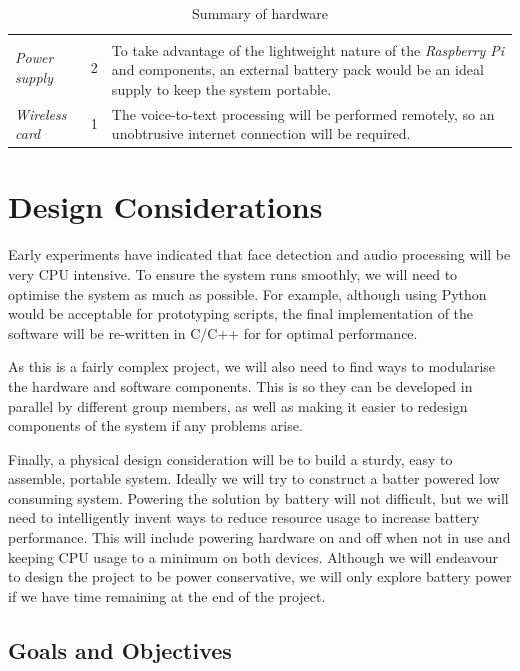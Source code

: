 \documentclass[11pt,a4paper,titlepage]{report}
\newcommand{\rpi}{\textit{Raspberry Pi\textsuperscript{\textregistered}}}
\begin{document}
\begin{center}
\begin{table}
{\begin{tabu}{ lcp{7cm} }
    \textit{Power supply} & 2 & To take advantage of the lightweight nature of the \rpi\xspace and components, an external battery pack would be an ideal supply to keep the system portable.\\ 


    \textit{Wireless card} & 1 & The voice-to-text processing will be performed remotely, so an unobtrusive internet connection will be required.\\ \hline
    
\end{tabu} }
\caption{Summary of hardware}
\label{table:hardwaretable}
\end{table}

\end{center}

\section{Design Considerations}

Early experiments have indicated that face detection and audio processing will be very CPU intensive. To ensure the system runs smoothly, we will need to optimise the system as much as possible. For example, although using Python would be acceptable for prototyping scripts, the final implementation of the software will be re-written in C/C++ for for optimal performance.

As this is a fairly complex project, we will also need to find ways to modularise the hardware and software components. This is so they can be developed in parallel by different group members, as well as making it easier to redesign components of the system if any problems arise.

Finally, a physical design consideration will be to build a sturdy, easy to assemble, portable system. Ideally we will try to construct a batter powered low consuming system. Powering the solution by battery will not difficult, but we will need to intelligently invent ways to reduce resource usage to increase battery performance. This will include powering hardware on and off when not in use and keeping CPU usage to a minimum on both devices. Although we will endeavour to design the project to be power conservative, we will only explore  battery power if we have time remaining at the end of the project. 


\subsection{Goals and Objectives}
\end{document}
